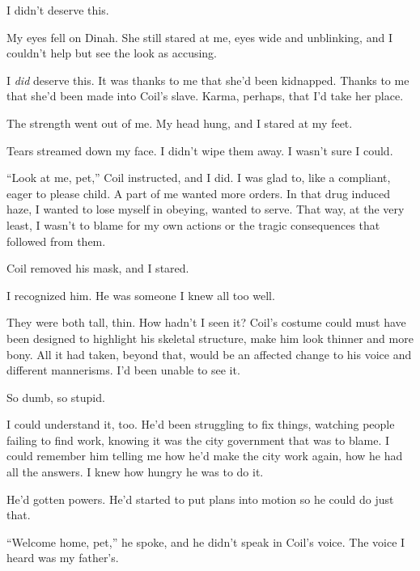 I didn't deserve this.



My eyes fell on Dinah.  She still stared at me, eyes wide and unblinking, and I couldn't help but see the look as accusing.



I \emph{did} deserve this.  It was thanks to me that she'd been kidnapped.  Thanks to me that she'd been made into Coil's slave.  Karma, perhaps, that I'd take her place.



The strength went out of me.  My head hung, and I stared at my feet.



Tears streamed down my face.  I didn't wipe them away.  I wasn't sure I could.



``Look at me, pet,'' Coil instructed, and I did.  I was glad to, like a compliant, eager to please child.  A part of me wanted more orders.  In that drug induced haze, I wanted to lose myself in obeying, wanted to serve.  That way, at the very least, I wasn't to blame for my own actions or the tragic consequences that followed from them.



Coil removed his mask, and I stared.



I recognized him.  He was someone I knew all too well.



They were both tall, thin.  How hadn't I seen it?  Coil's costume could must have been designed to highlight his skeletal structure, make him look thinner and more bony.  All it had taken, beyond that, would be an affected change to his voice and different mannerisms.  I'd been unable to see it.



So dumb, so stupid.



I could understand it, too.  He'd been struggling to fix things, watching people failing to find work, knowing it was the city government that was to blame.  I could remember him telling me how he'd make the city work again, how he had all the answers.  I knew how hungry he was to do it.



He'd gotten powers.  He'd started to put plans into motion so he could do just that.



``Welcome home, pet,'' he spoke, and he didn't speak in Coil's voice.  The voice I heard was my father's.



